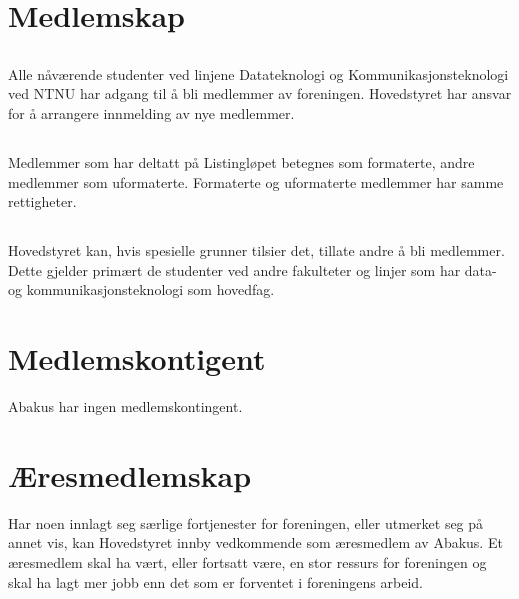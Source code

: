\section{Medlemskap}

\subsection{}
Alle nåværende studenter ved linjene Datateknologi og Kommunikasjonsteknologi
ved NTNU har adgang til å bli medlemmer av foreningen. Hovedstyret har ansvar
for å arrangere innmelding av nye medlemmer.

\subsection{}
Medlemmer som har deltatt på Listingløpet betegnes som formaterte, andre
medlemmer som uformaterte. Formaterte og uformaterte medlemmer har samme
rettigheter.

\subsection{}
Hovedstyret kan, hvis spesielle grunner tilsier det, tillate andre å bli
medlemmer. Dette gjelder primært de studenter ved andre fakulteter og linjer
som har data- og kommunikasjonsteknologi som hovedfag.

\section{Medlemskontigent}
Abakus har ingen medlemskontingent.

\section{Æresmedlemskap}
Har noen innlagt seg særlige fortjenester for foreningen, eller utmerket seg
på annet vis, kan Hovedstyret innby vedkommende som æresmedlem av Abakus. Et
æresmedlem skal ha vært, eller fortsatt være, en stor ressurs for foreningen og
skal ha lagt mer jobb enn det som er forventet i foreningens arbeid.
